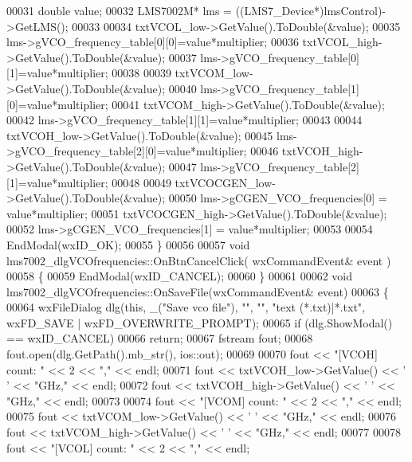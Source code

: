 \begin{DoxyCode}
{{{{{{{{00031     \textcolor{keywordtype}{double} value;
00032     LMS7002M* lms = ((LMS7_Device*)lmsControl)->GetLMS();
00033 
00034     txtVCOL_low->GetValue().ToDouble(&value);
00035     lms->gVCO_frequency_table[0][0]=value*multiplier;
00036     txtVCOL_high->GetValue().ToDouble(&value);
00037     lms->gVCO_frequency_table[0][1]=value*multiplier;
00038 
00039     txtVCOM_low->GetValue().ToDouble(&value);
00040     lms->gVCO_frequency_table[1][0]=value*multiplier;
00041     txtVCOM_high->GetValue().ToDouble(&value);
00042     lms->gVCO_frequency_table[1][1]=value*multiplier;
00043 
00044     txtVCOH_low->GetValue().ToDouble(&value);
00045     lms->gVCO_frequency_table[2][0]=value*multiplier;
00046     txtVCOH_high->GetValue().ToDouble(&value);
00047     lms->gVCO_frequency_table[2][1]=value*multiplier;
00048 
00049     txtVCOCGEN_low->GetValue().ToDouble(&value);
00050     lms->gCGEN_VCO_frequencies[0] = value*multiplier;
00051     txtVCOCGEN_high->GetValue().ToDouble(&value);
00052     lms->gCGEN_VCO_frequencies[1] = value*multiplier;
00053 
00054     EndModal(wxID\_OK);
00055 \}
00056 
00057 \textcolor{keywordtype}{void} lms7002_dlgVCOfrequencies::OnBtnCancelClick( wxCommandEvent& event )
00058 \{
00059     EndModal(wxID\_CANCEL);
00060 \}
00061 
00062 \textcolor{keywordtype}{void} lms7002_dlgVCOfrequencies::OnSaveFile(wxCommandEvent& event)
00063 \{
00064     wxFileDialog dlg(\textcolor{keyword}{this}, \_(\textcolor{stringliteral}{"Save vco file"}), \textcolor{stringliteral}{""}, \textcolor{stringliteral}{""}, \textcolor{stringliteral}{"text (*.txt)|*.txt"}, wxFD\_SAVE | 
      wxFD\_OVERWRITE\_PROMPT);
00065     \textcolor{keywordflow}{if} (dlg.ShowModal() == wxID\_CANCEL)
00066         \textcolor{keywordflow}{return};
00067     fstream fout;
00068     fout.open(dlg.GetPath().mb\_str(), ios::out);
00069 
00070     fout << \textcolor{stringliteral}{"[VCOH] count: "} << 2 << \textcolor{stringliteral}{","} << endl;
00071     fout << txtVCOH_low->GetValue() << \textcolor{charliteral}{' '} << \textcolor{stringliteral}{"GHz,"} << endl;
00072     fout << txtVCOH_high->GetValue() << \textcolor{charliteral}{' '} << \textcolor{stringliteral}{"GHz,"} << endl;
00073 
00074     fout << \textcolor{stringliteral}{"[VCOM] count: "} << 2 << \textcolor{stringliteral}{","} << endl;
00075     fout << txtVCOM_low->GetValue() << \textcolor{charliteral}{' '} << \textcolor{stringliteral}{"GHz,"} << endl;
00076     fout << txtVCOM_high->GetValue() << \textcolor{charliteral}{' '} << \textcolor{stringliteral}{"GHz,"} << endl;
00077 
00078     fout << \textcolor{stringliteral}{"[VCOL] count: "} << 2 << \textcolor{stringliteral}{","} << endl;
}}}}}}}}
\end{DoxyCode}

